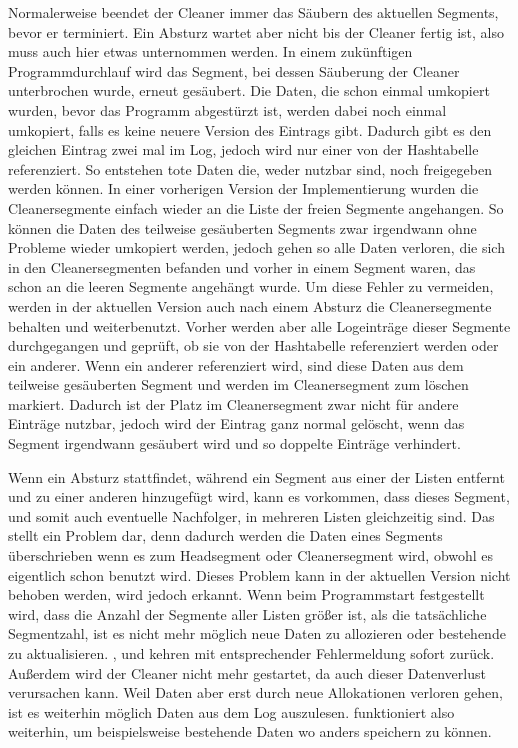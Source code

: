 \documentclass{class/thesis}
\begin{document}
\begin{thesis}
	Normalerweise beendet der Cleaner immer das Säubern des aktuellen Segments, bevor er terminiert. Ein Absturz wartet aber nicht bis der Cleaner fertig ist, also muss auch hier etwas unternommen werden.
	In einem zukünftigen Programmdurchlauf wird das Segment, bei dessen Säuberung der Cleaner unterbrochen wurde, erneut gesäubert.
	Die Daten, die schon einmal umkopiert wurden, bevor das Programm abgestürzt ist, werden dabei noch einmal umkopiert, falls es keine neuere Version des Eintrags gibt.
	Dadurch gibt es den gleichen Eintrag zwei mal im Log, jedoch wird nur einer von der Hashtabelle referenziert.
	So entstehen tote Daten die, weder nutzbar sind, noch freigegeben werden können.
	In einer vorherigen Version der Implementierung wurden die Cleanersegmente einfach wieder an die Liste der freien Segmente angehangen. 
	So können die Daten des teilweise gesäuberten Segments zwar irgendwann ohne Probleme wieder umkopiert werden, jedoch gehen so alle Daten verloren, die sich in den Cleanersegmenten befanden und vorher in einem Segment waren, das schon an die leeren Segmente angehängt wurde.
	Um diese Fehler zu vermeiden, werden in der aktuellen Version auch nach einem Absturz die Cleanersegmente behalten und weiterbenutzt. 
	Vorher werden aber alle Logeinträge dieser Segmente durchgegangen und geprüft, ob sie von der Hashtabelle referenziert werden oder ein anderer.
	Wenn ein anderer referenziert wird, sind diese Daten aus dem teilweise gesäuberten Segment und werden im Cleanersegment zum löschen markiert. 
	Dadurch ist der Platz im Cleanersegment zwar nicht für andere Einträge nutzbar, jedoch wird der Eintrag ganz normal gelöscht, wenn das Segment irgendwann gesäubert wird und so doppelte Einträge verhindert.
	
	Wenn ein Absturz stattfindet, während ein Segment aus einer der Listen entfernt und zu einer anderen hinzugefügt wird, kann es vorkommen, dass dieses Segment, und somit auch eventuelle Nachfolger, in mehreren Listen gleichzeitig sind. Das stellt ein Problem dar, denn dadurch werden die Daten eines Segments überschrieben wenn es zum Headsegment oder Cleanersegment wird, obwohl es eigentlich schon benutzt wird.
	Dieses Problem kann in der aktuellen Version nicht behoben werden, wird jedoch erkannt. 
	Wenn beim Programmstart festgestellt wird, dass die Anzahl der Segmente aller Listen größer ist, als die tatsächliche Segmentzahl, ist es nicht mehr möglich neue Daten zu allozieren oder bestehende zu aktualisieren.
	,  und  kehren mit entsprechender Fehlermeldung sofort zurück.
	Außerdem wird der Cleaner nicht mehr gestartet, da auch dieser Datenverlust verursachen kann.
	Weil Daten aber erst durch neue Allokationen verloren gehen, ist es weiterhin möglich Daten aus dem Log auszulesen. 
	 funktioniert also weiterhin, um beispielsweise bestehende Daten wo anders speichern zu können.
	

\end{thesis}
\end{document}
